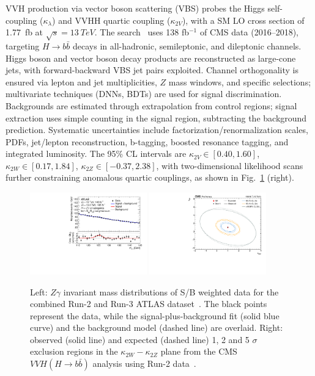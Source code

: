\documentclass[a4paper,11pt]{article}
\begin{document}
VVH production via vector boson scattering (VBS) probes the Higgs
self-coupling ($\kappa_\lambda$) and VVHH quartic coupling
($\kappa_{2V}$), with a SM LO cross section of \SI{1.77}{fb} at
$\sqrt{s} = \SI{13}{TeV}$.  The search~\cite{vvhbb-cms} uses 138
fb$^{-1}$ of CMS data (2016--2018), targeting $H \to b\bar{b}$ decays
in all-hadronic, semileptonic, and dileptonic channels.  Higgs boson
and vector boson decay products are reconstructed as large-cone jets,
with forward-backward VBS jet pairs exploited.  Channel orthogonality
is ensured via lepton and jet multiplicities, $Z$ mass windows, and
specific selections; multivariate techniques (DNNs, BDTs) are used for
signal discrimination.  Backgrounds are estimated through
extrapolation from control regions; signal extraction uses simple
counting in the signal region, subtracting the background prediction.
Systematic uncertainties include factorization/renormalization scales,
PDFs, jet/lepton reconstruction, b-tagging, boosted resonance tagging,
and integrated luminosity.  The 95\% CL intervals are $\kappa_{2V} \in
[0.40, 1.60]$, $\kappa_{2W} \in [0.17, 1.84]$, $\kappa_{2Z} \in
[-0.37, 2.38]$, with two-dimensional likelihood scans further
constraining anomalous quartic couplings, as shown in
Fig.~\ref{fig:rare} (right).



\begin{figure}[!tbp]
\centering
\includegraphics[width=0.45\textwidth]{hzgamma-atlas}
\includegraphics[width=0.45\textwidth]{vvhbb-cms}
\caption
    {Left: $Z\gamma$ invariant mass distributions of S/B weighted data
      for the combined Run-2 and Run-3 ATLAS
      dataset~\cite{hzgamma-atlas}. The black points represent the
      data, while the signal-plus-background fit (solid blue curve)
      and the background model (dashed line) are overlaid.  Right:
      observed (solid line) and expected (dashed line) 1, 2 and 5
      $\sigma$ exclusion regions in the $\kappa_{2W}-\kappa_{2Z}$
      plane from the CMS $VVH(H \to b\bar b)$ analysis using Run-2
      data~\cite{vvhbb-cms}.
      \label{fig:rare}
    }
\end{figure}
\end{document}
